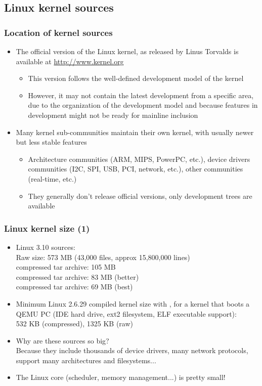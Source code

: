 \subsection{Linux kernel sources}

\begin{frame}
  \frametitle{Location of kernel sources}
  \begin{itemize}
  \item The official version of the Linux kernel, as released by Linus
    Torvalds is available at \url{http://www.kernel.org}
    \begin{itemize}
    \item This version follows the well-defined development model of
      the kernel
    \item However, it may not contain the latest development from a
      specific area, due to the organization of the development model
      and because features in development might not be ready for
      mainline inclusion
    \end{itemize}
  \item Many kernel sub-communities maintain their own kernel, with
    usually newer but less stable features
    \begin{itemize}
    \item Architecture communities (ARM, MIPS, PowerPC, etc.), device
      drivers communities (I2C, SPI, USB, PCI, network, etc.), other
      communities (real-time, etc.)
    \item They generally don't release official versions, only
      development trees are available
    \end{itemize}
  \end{itemize}
\end{frame}

\begin{frame}
  \frametitle{Linux kernel size (1)}
  \begin{itemize}
  \item Linux 3.10 sources:\\
    Raw size: 573 MB (43,000 files, approx 15,800,000 lines)\\
     compressed tar archive: 105 MB\\
     compressed tar archive: 83 MB (better)\\
     compressed tar archive: 69 MB (best)
  \item Minimum Linux 2.6.29 compiled kernel size with
    , for a kernel that boots a QEMU PC (IDE
    hard drive, ext2 filesystem, ELF executable support):\\
    532 KB (compressed), 1325 KB (raw)
  \item Why are these sources so big?\\
    Because they include thousands of device drivers, many network
    protocols, support many architectures and filesystems...
  \item The Linux core (scheduler, memory management...) is pretty
    small!
  \end{itemize}
\end{frame}

